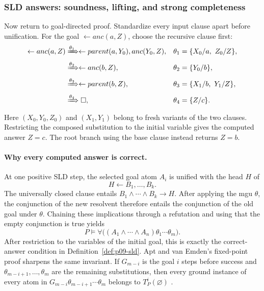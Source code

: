 \subsubsection{SLD answers: soundness, lifting, and strong completeness}

Now return to goal-directed proof.  Standardize every input clause apart before
unification.  For the goal \(\leftarrow anc(a,Z)\), choose the recursive clause
first:
\[
\begin{aligned}
 \leftarrow anc(a,Z)
 &\xRightarrow{\theta_1}
   \leftarrow parent(a,Y_0),anc(Y_0,Z),
 &\theta_1&=\{X_0/a,\ Z_0/Z\},\\
 &\xRightarrow{\theta_2}
   \leftarrow anc(b,Z),
 &\theta_2&=\{Y_0/b\},\\
 &\xRightarrow{\theta_3}
   \leftarrow parent(b,Z),
 &\theta_3&=\{X_1/b,\ Y_1/Z\},\\
 &\xRightarrow{\theta_4}\Box,
 &\theta_4&=\{Z/c\}.
\end{aligned}
\]
Here \((X_0,Y_0,Z_0)\) and \((X_1,Y_1)\) belong to fresh variants of the two
clauses.  Restricting the composed substitution to the initial variable gives
the computed answer \(Z=c\).  The root branch using the base clause instead
returns \(Z=b\).

\paragraph{Why every computed answer is correct.}
At one positive SLD step, the selected goal atom \(A_i\) is unified with the
head \(H\) of
\[
 H\leftarrow B_1,\ldots,B_k.
\]
The universally closed clause entails
\(B_1\land\cdots\land B_k\to H\).  After applying the mgu \(\theta\), the
conjunction of the new resolvent therefore entails the conjunction of the old
goal under \(\theta\).  Chaining these implications through a refutation and
using that the empty conjunction is true yields
\[
 P\models
 \forall\bigl((A_1\land\cdots\land A_n)
              \theta_1\cdots\theta_m\bigr).
\]
After restriction to the variables of the initial goal, this is exactly the
correct-answer condition in Definition~\ref{def:p09-sld}.  Apt and van Emden's
fixed-point proof sharpens the same invariant.  If \(G_{m-i}\) is the goal
\(i\) steps before success and \(\theta_{m-i+1},\ldots,\theta_m\) are the
remaining substitutions, then every ground instance of every atom in
\(G_{m-i}\theta_{m-i+1}\cdots\theta_m\) belongs to
\(T_P^i(\varnothing)\)
\cite[thm.~5.1 and cor.~5.2]{AptVanEmden1982}.

